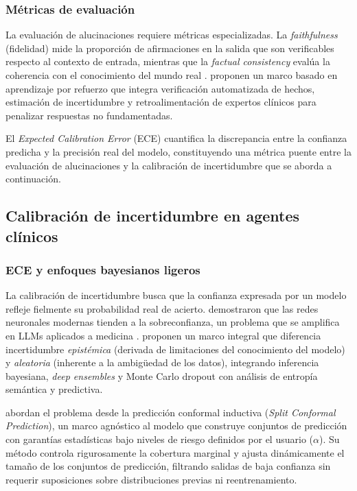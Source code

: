 \subsubsection{Métricas de evaluación}

La evaluación de alucinaciones requiere métricas especializadas. La \emph{faithfulness} (fidelidad) mide la proporción de afirmaciones en la salida que son verificables respecto al contexto de entrada, mientras que la \emph{factual consistency} evalúa la coherencia con el conocimiento del mundo real \parencite{Huang2025survey}. \textcite{gorle2024} proponen un marco basado en aprendizaje por refuerzo que integra verificación automatizada de hechos, estimación de incertidumbre y retroalimentación de expertos clínicos para penalizar respuestas no fundamentadas.

El \emph{Expected Calibration Error} (ECE) \parencite{Naeini2015ece,Guo2017calibration} cuantifica la discrepancia entre la confianza predicha y la precisión real del modelo, constituyendo una métrica puente entre la evaluación de alucinaciones y la calibración de incertidumbre que se aborda a continuación.

\subsection{Calibración de incertidumbre en agentes clínicos}
\label{subsec:calibracion}

\subsubsection{ECE y enfoques bayesianos ligeros}

La calibración de incertidumbre busca que la confianza expresada por un modelo refleje fielmente su probabilidad real de acierto. \textcite{Guo2017calibration} demostraron que las redes neuronales modernas tienden a la sobreconfianza, un problema que se amplifica en \ac{LLM}s aplicados a medicina \parencite{Atf2025uncertainty}. \textcite{Atf2025uncertainty} proponen un marco integral que diferencia incertidumbre \emph{epistémica} (derivada de limitaciones del conocimiento del modelo) y \emph{aleatoria} (inherente a la ambigüedad de los datos), integrando inferencia bayesiana, \emph{deep ensembles} y Monte Carlo dropout con análisis de entropía semántica y predictiva.

\textcite{Ye2025conformal} abordan el problema desde la predicción conformal inductiva (\emph{Split Conformal Prediction}), un marco agnóstico al modelo que construye conjuntos de predicción con garantías estadísticas bajo niveles de riesgo definidos por el usuario ($\alpha$). Su método controla rigurosamente la cobertura marginal y ajusta dinámicamente el tamaño de los conjuntos de predicción, filtrando salidas de baja confianza sin requerir suposiciones sobre distribuciones previas ni reentrenamiento.

